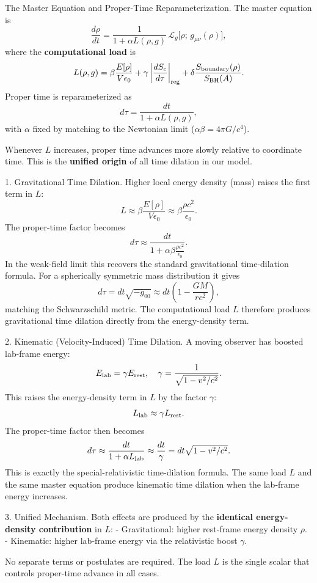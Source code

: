 \documentclass[reprint,amsmath,amssymb,aps,prd,preprintnumbers,superscriptaddress,longbibliography,10pt]{revtex4-2}
\begin{document}
The Master Equation and Proper-Time Reparameterization. The master equation is
\[
\frac{d\rho}{dt} = \frac{1}{1 + \alpha L(\rho,g)} \,\mathcal{L}_g\bigl[\rho;\, g_{\mu\nu}(\rho)\bigr],
\]
where the \textbf{computational load} is
\[
L(\rho,g) = \beta \frac{E[\rho]}{V \epsilon_0} + \gamma \left| \frac{d S_c}{d\tau} \right|_{\rm reg} + \delta \frac{S_{\rm boundary}(\rho)}{S_{\rm BH}(A)}.
\]
Proper time is reparameterized as
\[
d\tau = \frac{dt}{1 + \alpha L(\rho,g)},
\]
with \(\alpha\) fixed by matching to the Newtonian limit (\(\alpha\beta = 4\pi G / c^4\)).

Whenever \(L\) increases, proper time advances more slowly relative to coordinate time. This is the \textbf{unified origin} of all time dilation in our model.

1. Gravitational Time Dilation. Higher local energy density (mass) raises the first term in \(L\):
\[
L \approx \beta \frac{E[\rho]}{V \epsilon_0} \approx \beta \frac{\rho c^2}{\epsilon_0}.
\]
The proper-time factor becomes
\[
d\tau \approx \frac{dt}{1 + \alpha \beta \frac{\rho c^2}{\epsilon_0}}.
\]
In the weak-field limit this recovers the standard gravitational time-dilation formula. For a spherically symmetric mass distribution it gives
\[
d\tau = dt \sqrt{-g_{00}} \approx dt \left(1 - \frac{GM}{rc^2}\right),
\]
matching the Schwarzschild metric. The computational load \(L\) therefore produces gravitational time dilation directly from the energy-density term.

2. Kinematic (Velocity-Induced) Time Dilation. A moving observer has boosted lab-frame energy:
\[
E_{\rm lab} = \gamma E_{\rm rest}, \quad \gamma = \frac{1}{\sqrt{1 - v^2/c^2}}.
\]
This raises the energy-density term in \(L\) by the factor \(\gamma\):
\[
L_{\rm lab} \approx \gamma L_{\rm rest}.
\]
The proper-time factor then becomes
\[
d\tau \approx \frac{dt}{1 + \alpha L_{\rm lab}} \approx \frac{dt}{\gamma} = dt \sqrt{1 - v^2/c^2}.
\]
This is exactly the special-relativistic time-dilation formula. The same load \(L\) and the same master equation produce kinematic time dilation when the lab-frame energy increases.

3. Unified Mechanism. Both effects are produced by the \textbf{identical energy-density contribution} in \(L\):
- Gravitational: higher rest-frame energy density \(\rho\).
- Kinematic: higher lab-frame energy via the relativistic boost \(\gamma\).

No separate terms or postulates are required. The load \(L\) is the single scalar that controls proper-time advance in all cases.
\end{document}
